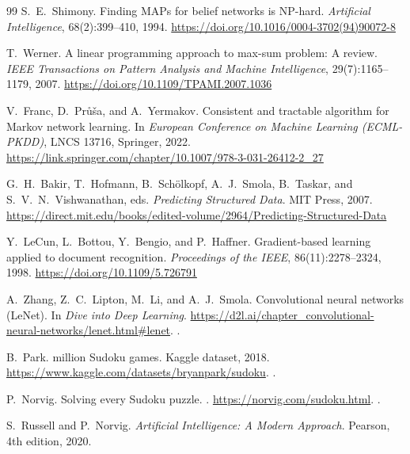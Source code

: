 \documentclass{ctuthesis}
\begin{document}
\begin{thebibliography}{99}
S.~E.~Shimony.
\newblock Finding MAPs for belief networks is NP-hard.
\newblock \emph{Artificial Intelligence}, 68(2):399--410, 1994.
\newblock \url{https://doi.org/10.1016/0004-3702(94)90072-8}

T.~Werner.
\newblock A linear programming approach to max-sum problem: A review.
\newblock \emph{IEEE Transactions on Pattern Analysis and Machine
Intelligence}, 29(7):1165--1179, 2007.
\newblock \url{https://doi.org/10.1109/TPAMI.2007.1036}

V.~Franc, D.~Pr\r{u}\v{s}a, and A.~Yermakov.
\newblock Consistent and tractable algorithm for Markov network
learning.
\newblock In \emph{European Conference on Machine Learning (ECML-PKDD)},
LNCS 13716, Springer, 2022.
\newblock \url{https://link.springer.com/chapter/10.1007/978-3-031-26412-2_27}

G.~H.~Bakir, T.~Hofmann, B.~Sch\"olkopf, A.~J.~Smola, B.~Taskar, and
S.~V.~N.~Vishwanathan, eds.
\newblock \emph{Predicting Structured Data}.
\newblock MIT Press, 2007.
\newblock \url{https://direct.mit.edu/books/edited-volume/2964/Predicting-Structured-Data}

Y.~LeCun, L.~Bottou, Y.~Bengio, and P.~Haffner.
\newblock Gradient-based learning applied to document recognition.
\newblock \emph{Proceedings of the IEEE}, 86(11):2278--2324, 1998.
\newblock \url{https://doi.org/10.1109/5.726791}

A.~Zhang, Z.~C.~Lipton, M.~Li, and A.~J.~Smola.
\newblock Convolutional neural networks (LeNet).
\newblock In \emph{Dive into Deep Learning}.
\newblock \url{https://d2l.ai/chapter_convolutional-neural-networks/lenet.html#lenet}.
.

B.~Park.
 million Sudoku games.
\newblock Kaggle dataset, 2018.
\newblock \url{https://www.kaggle.com/datasets/bryanpark/sudoku}.
.

P.~Norvig.
\newblock Solving every Sudoku puzzle.
.
\newblock \url{https://norvig.com/sudoku.html}.
.

S.~Russell and P.~Norvig.
\newblock \emph{Artificial Intelligence: A Modern Approach}.
\newblock Pearson, 4th edition, 2020.


\end{thebibliography}
\end{document}
